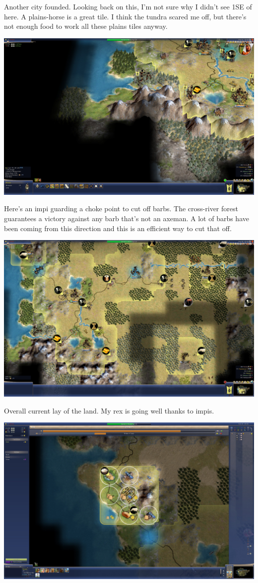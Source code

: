 \documentclass[10pt]{article}
\begin{document}
Another city founded. Looking back on this, I'm not sure why I didn't see 1SE of here. A plains-horse is
a great tile. I think the tundra scared me off, but there's not enough food to work all these plains tiles
anyway.

\includegraphics[width=1.0\textwidth]{54}

Here's an impi guarding a choke point to cut off barbs. The cross-river forest guarantees a victory against any
barb that's not an axeman. A lot of barbs have been coming from this direction and this is an efficient way
to cut that off.

\includegraphics[width=1.0\textwidth]{55}

Overall current lay of the land. My rex is going well thanks to impis.

\includegraphics[width=1.0\textwidth]{56}
\end{document}
